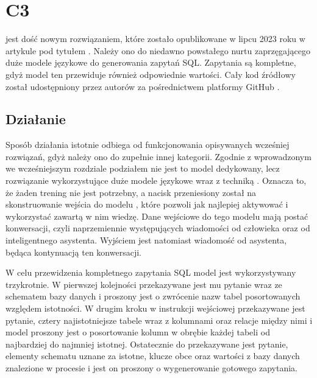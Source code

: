 \section{C3}
 jest dość nowym rozwiązaniem, które zostało opublikowane w lipcu 2023 roku w artykule pod tytułem  \cite{Dong2023}. Należy ono do niedawno powstałego nurtu zaprzęgającego duże modele językowe do generowania zapytań SQL. Zapytania są kompletne, gdyż model ten przewiduje również odpowiednie wartości. Cały kod źródłowy  został udostępniony przez autorów za pośrednictwem platformy GitHub \cite{c3-repository}. 

\subsection{Działanie}
Sposób działania  istotnie odbiega od funkcjonowania opisywanych wcześniej rozwiązań, gdyż należy ono do zupełnie innej kategorii. Zgodnie z wprowadzonym we wcześniejszym rozdziale podziałem nie jest to model dedykowany, lecz rozwiązanie wykorzystujące duże modele językowe wraz z techniką . Oznacza to, że żaden trening nie jest potrzebny, a nacisk przeniesiony został na skonstruowanie wejścia do modelu , które pozwoli jak najlepiej aktywować i wykorzystać zawartą w nim wiedzę. Dane wejściowe do tego modelu mają postać konwersacji, czyli naprzemiennie występujących wiadomości od człowieka oraz od inteligentnego asystenta. Wyjściem jest natomiast wiadomość od asystenta, będąca kontynuacją ten konwersacji.

W celu przewidzenia kompletnego zapytania SQL model  jest wykorzystywany trzykrotnie. W pierwszej kolejności przekazywane jest mu pytanie wraz ze schematem bazy danych i proszony jest o zwrócenie nazw tabel posortowanych względem istotności. W drugim kroku w instrukcji wejściowej przekazywane jest pytanie, cztery najistotniejsze tabele wraz z kolumnami oraz relacje między nimi i model proszony jest o posortowanie kolumn w obrębie każdej tabeli od najbardziej do najmniej istotnej. Ostatecznie do  przekazywane jest pytanie, elementy schematu uznane za istotne, klucze obce oraz wartości z bazy danych znalezione w procesie  i jest on proszony o wygenerowanie gotowego zapytania.

